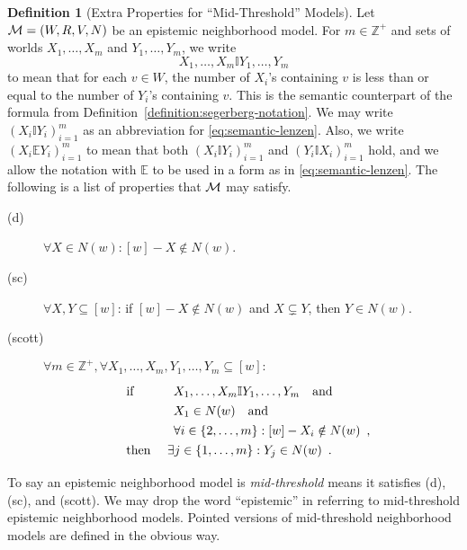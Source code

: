 \documentclass[12pt]{article}
\theoremstyle{definition}
\newtheorem{definition}[theorem]{Definition}
\newcommand{\Int}{\mathbb{Z}}  %
\newcommand{\M}{{\cal M}}      %
\newcommand{\Lang}{{\cal L}}   %
\newcommand{\KB}{{\mathsf{KB}}}                 %
\newcommand{\semn}[1]{\llbracket{#1}\rrbracket_{\mathsf{n}}} %
\begin{document}
\begin{definition}[Extra Properties for ``Mid-Threshold'' Models]
  \label{definition:extra-properties}
  Let $\M=(W,R,V,N)$ be an epistemic neighborhood model.  For
  $m\in\Int^+$ and sets of worlds $X_1,\dots,X_m$ and $Y_1,\dots,Y_m$,
  we write
  \begin{equation}
    X_1,\dots,X_m\mathbb{I}Y_1,\dots,Y_m
    \label{eq:semantic-lenzen}
  \end{equation}
  to mean that for each $v\in W$, the number of $X_i$'s containing $v$
  is less than or equal to the number of $Y_i$'s containing $v$. This
  is the semantic counterpart of the formula from
  Definition~\ref{definition:segerberg-notation}.  We may write
  $(X_i\mathbb{I}Y_i)_{i=1}^m$ as an abbreviation for
  \eqref{eq:semantic-lenzen}.  Also, we write
  $(X_i\mathbb{E}Y_i)_{i=1}^m$ to mean that both
  $(X_i\mathbb{I}Y_i)_{i=1}^m$ and $(Y_i\mathbb{I}X_i)_{i=1}^m$
  hold, and we allow the notation with $\mathbb{E}$ to be used in a
  form as in \eqref{eq:semantic-lenzen}.  The following is a list of
  properties that $\M$ may satisfy.
  \begin{description}
  \item[(d)] $\forall X \in N(w): [w] - X \notin  N(w)$.

 
  \item[(sc)] $\forall X,Y\subseteq[w]$: if $[w]-X\notin N(w)$
    and $X\subsetneq Y$, then $Y\in N(w)$.

  \item[(scott)] $\forall m\in\Int^+,\forall
    X_1,\dots,X_m,Y_1,\dots,Y_m\subseteq[w]:$
    \[
    \renewcommand{\arraystretch}{1.3}
    \begin{array}{ll}
      \text{if }
      &
      \begin{array}[t]{l}
        X_1,\dots,X_m\mathbb{I}Y_1,\dots,Y_m\quad\text{and}
        \\
        X_1\in N(w)\quad\text{and}
        \\
        \forall i\in\{2,\dots,m\}:
        [w]-X_i\notin N(w) \enspace\text{,}
      \end{array}
      \\
      \text{then }
      &
      \exists j\in\{1,\dots,m\}: Y_j\in N(w)\enspace\text{.}
    \end{array}
    \]
  \end{description}
  To say an epistemic neighborhood model is \emph{mid-threshold} means
  it satisfies (d), (sc), and (scott).  We may drop the word
  ``epistemic'' in referring to mid-threshold epistemic neighborhood
  models.  Pointed versions of mid-threshold neighborhood models are
  defined in the obvious way.
\end{definition}
\end{document}
